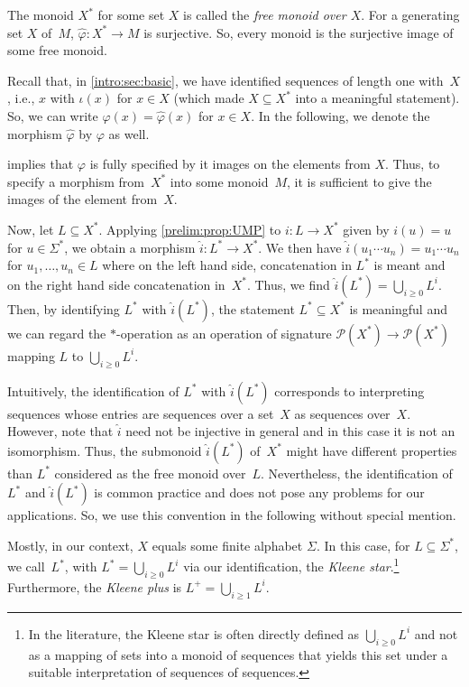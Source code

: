 The monoid $X^*$ for some set $X$ is called the 
\emph{free monoid over $X$}. 
For a generating set $X$ of~$M$, $\hat \varphi \colon X^* \to M$
is surjective. So, every monoid is the surjective image
of some free monoid.

Recall that, in \cref{intro:sec:basic}, we have identified sequences of length one with~$X$, i.e., $x$ with 
$\iota(x)$ for $x \in X$ (which made $X \subseteq X^*$ into a meaningful statement). 
So, we can write $\varphi(x) = \hat{\varphi}(x)$ for $x \in X$.
In the following, we denote the morphism $\hat\varphi$ by $\varphi$ as well.

 implies that $\varphi$ 
is fully specified by it images on the elements from $X$.
Thus, to specify a morphism from~$X^*$ into some monoid~$M$,
it is sufficient to give the images of the element from~$X$.

Now, let $L \subseteq X^*$.
Applying \cref{prelim:prop:UMP}
to $i \colon L \to X^*$ given by $i(u) = u$ for $u \in \Sigma^*$, we 
obtain a morphism $\hat{i} \colon L^* \to X^*$.
We then have $\hat{i}(u_1  \cdots  u_n) = u_1  \cdots  u_n$
for $u_1, \ldots, u_n \in L$ where on the left hand side, concatenation in $L^*$
is meant and on the right hand side concatenation in~$X^*$.
Thus, we find $\hat{i}(L^*) = \bigcup_{i \ge 0} L^i$.
Then, by identifying $L^*$ with $\hat{i}(L^*)$,
the statement $L^* \subseteq X^*$ is meaningful
and we can regard the $\ast$-operation as an operation of signature $\mathcal P(X^*) \to \mathcal P(X^*)$
mapping $L$ to $\bigcup_{i \ge 0} L^i$.

Intuitively, the identification of $L^*$ with $\hat{i}(L^*)$
corresponds to interpreting sequences whose entries are sequences over a set~$X$ as sequences over~$X$.
However, note that $\hat{i}$ need not be injective in general
and in this case it is not an isomorphism.
Thus, the submonoid $\hat{i}(L^*)$ of~$X^*$ 
might have different properties than $L^*$ considered as the free monoid over~$L$.
Nevertheless, the identification of $L^*$ and $\hat{i}(L^*)$
is common practice and does not pose any problems for our applications.
So, we use this convention in the following
without special mention.

\label{def:Kleenestar}
\label{def:Kleeneplus}
Mostly, in our context, $X$ equals some finite alphabet $\Sigma$.
In this case, for $L \subseteq \Sigma^*$, 
we call~$L^*$, with $L^* = \bigcup_{i \ge 0} L^i$ via our identification,
the \emph{Kleene star}.\footnote{In the literature, the Kleene star
	is often directly defined as $\bigcup_{i \ge 0} L^i$
	and not as a mapping of sets into a monoid of sequences
	that yields this set under a suitable 
	interpretation of sequences of sequences.}
Furthermore, the \emph{Kleene plus} is $L^+ = \bigcup_{i \ge 1} L^i$. 

